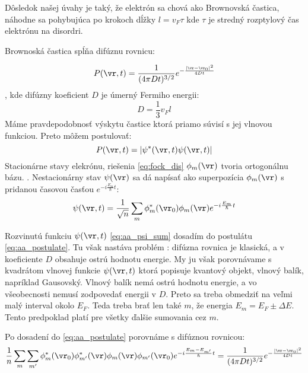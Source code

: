 Dôsledok našej úvahy je taký, že elektrón sa chová ako Brownovská častica, náhodne sa pohybujúca
po krokoch dĺžky $l=v_F \tau$  kde $\tau$ je stredný rozptylový čas elektrónu na disordri.

Brownoská častica spĺňa difúznu rovnicu:

\begin{equation}
 \label{eq:diffusion}
 P(\vr,t)=\frac{1}{(4\pi Dt)^{3/2}}e^{-\frac{|\vr-\vr_0|^2}{4Dt}}
\end{equation}
, kde difúzny koeficient $D$ je úmerný Fermiho energii:
\begin{equation}
\label{eq:diff_coef}
 D=\frac{1}{3}v_Fl
\end{equation}
Máme pravdepodobnosť výskytu častice ktorá priamo súvisí s jej vlnovou funkciou. Preto môžem postulovať:
\begin{equation}
 \label{eq:aa_postulate}
 P(\vr,t)=|\psi^*(\vr,t)\psi(\vr,t)|
\end{equation}
Stacionárne stavy elekrónu, riešenia \eqref{eq:fock_dis} $\phi_m(\vr)$ tvoria ortogonálnu bázu.
. Nestacionárny stav $\psi(\vr)$ sa dá napísať ako  superpozícia $\phi_m(\vr)$ s pridanou časovou časťou $e^{-i\frac{E_m}{\hbar}t}$:
\begin{equation}
 \label{eq:aa_psi_sum}
 \psi(\vr,t)=\frac{1}{\sqrt{n}}\sum_m \phi_m^*(\vr_0)\phi_m(\vr)e^{-i\frac{E_m}{\hbar}t}
\end{equation}

Rozvinutú funkciu $\psi(\vr,t)$ \eqref{eq:aa_psi_sum} dosadím do postulátu \eqref{eq:aa_postulate}.
Tu však nastáva problém : difúzna rovnica je klasická, a v koeficiente $D$ obsahuje ostrú hodnotu energie. My ju však porovnávame s kvadrátom
vlnovej funkcie $\psi(\vr,t)$ ktorá popisuje kvantový objekt, vlnový balík, napríklad Gausovský. Vlnový balík nemá ostrú hodnotu energie,
a vo všeobecnosti nemusí zodpovedať energii v $D$. Preto sa treba obmedziť na veľmi malý interval okolo $E_F$. Teda treba brať len také
$m$, že energia  $E_m=E_F\pm \Delta E$. Tento predpoklad platí pre všetky ďalšie sumovania cez $m$.

Po dosadení do \eqref{eq:aa_postulate} porovnáme s difúznou rovnicou:
\begin{equation}
 \label{eq:aa_matrix_element_eq}
 \frac{1}{n}\sum_m \sum_{m'} \phi_m^*(\vr_0)\phi^*_{m'}(\vr)\phi_m(\vr)\phi_{m'}(\vr_0)e^{-i\frac{E_m-E_{m'}}{\hbar}t}=\frac{1}{(4\pi Dt)^{3/2}}e^{-\frac{|\vr-\vr_0|^2}{4Dt}}
\end{equation}

